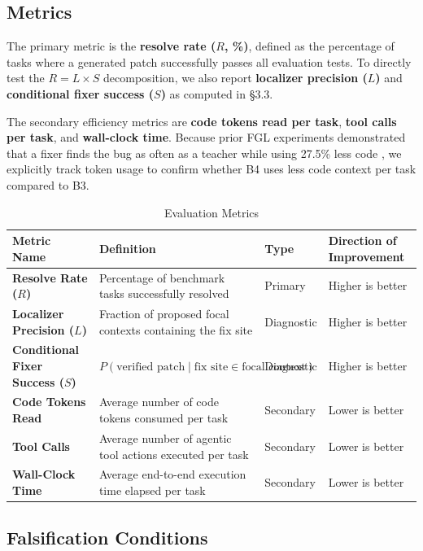 \documentclass[11pt,a4paper]{article}
\begin{document}
\subsection{Metrics}
The primary metric is the \textbf{resolve rate ($R$, \%)}, defined as the percentage of tasks where a generated patch successfully passes all evaluation tests. To directly test the $R = L \times S$ decomposition, we also report \textbf{localizer precision ($L$)} and \textbf{conditional fixer success ($S$)} as computed in \S3.3.

The secondary efficiency metrics are \textbf{code tokens read per task}, \textbf{tool calls per task}, and \textbf{wall-clock time}. Because prior FGL experiments demonstrated that a fixer finds the bug as often as a teacher while using 27.5\% less code \cite{FGL}, we explicitly track token usage to confirm whether B4 uses less code context per task compared to B3.

\begin{table}[H]
\centering
\caption{Evaluation Metrics}
\label{tab:metrics}
\vspace{4pt}
\begin{tabularx}{\textwidth}{l Y l l}
\toprule
\textbf{Metric Name} & \textbf{Definition} & \textbf{Type} & \textbf{Direction of Improvement} \\
\midrule
\textbf{Resolve Rate ($R$)} & Percentage of benchmark tasks successfully resolved & Primary & Higher is better \\
\textbf{Localizer Precision ($L$)} & Fraction of proposed focal contexts containing the fix site & Diagnostic & Higher is better \\
\textbf{Conditional Fixer Success ($S$)} & $P(\text{verified patch} \mid \text{fix site} \in \text{focal context})$ & Diagnostic & Higher is better \\
\textbf{Code Tokens Read} & Average number of code tokens consumed per task & Secondary & Lower is better \\
\textbf{Tool Calls} & Average number of agentic tool actions executed per task & Secondary & Lower is better \\
\textbf{Wall-Clock Time} & Average end-to-end execution time elapsed per task & Secondary & Lower is better \\
\bottomrule
\end{tabularx}
\end{table}

\subsection{Falsification Conditions}
\end{document}
